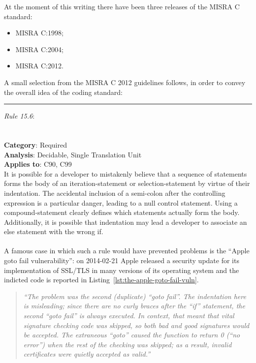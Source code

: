 At the moment of this writing there have been three releases of the MISRA C standard:
\begin{itemize}
  \item MISRA C:1998;
  \item MISRA C:2004;
  \item MISRA C:2012.
\end{itemize}
A small selection from the MISRA C 2012 guidelines follows, in order to convey the overall idea of the coding standard:

\noindent\rule{\textwidth}{0.1pt}

\emph{Rule 15.6}:\\

\noindent{}
\\\\
\textbf{Category}: Required\\
\textbf{Analysis}: Decidable, Single Translation Unit\\
\textbf{Applies to}: C90, C99\\

It is possible for a developer to mistakenly believe that a sequence of statements forms the body of an iteration-statement or selection-statement by virtue of their indentation. The accidental inclusion of a semi-colon after the controlling expression is a particular danger, leading to a null control statement. Using a compound-statement clearly defines which statements actually form the body.
Additionally, it is possible that indentation may lead a developer to associate an else statement with the wrong if.
\\\\
A famous case in which such a rule would have prevented problems is the ``Apple goto fail vulnerability'': 
on 2014-02-21 Apple released a security update for its implementation of SSL/TLS in many versions of its operating system 
and the indicted code is reported in Listing~\ref{lst:the-apple-goto-fail-vuln}.
\begin{quote}
\itshape
``The problem was the second (duplicate) ``goto fail''. 
The indentation here is misleading; since there are no curly braces after the ``if'' statement, the second ``goto fail'' is always executed. In context, that meant that vital signature checking code was skipped, so both bad and good signatures would be accepted. The extraneous ``goto'' caused the function to return 0 (``no error'') when the rest of the checking was skipped; as a result, invalid certificates were quietly accepted as valid.'' \cite{TheAppleGotoFailVulnerability}
\end{quote}

